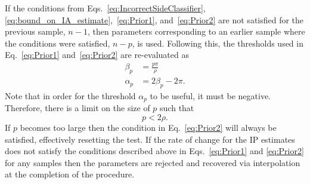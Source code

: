 \documentclass[11pt,draftcls,onecolumn]{IEEEtran}
\begin{document}
If the conditions from Eqs.~\ref{eq:IncorrectSideClassifier}, \ref{eq:bound_on_IA_estimate},~\ref{eq:Prior1}, and~\ref{eq:Prior2} are not satisfied for the previous sample, $n-1$, then parameters corresponding to an earlier sample where the conditions were satisfied, $n-p$, is used. Following this, the thresholds used in Eq.~\ref{eq:Prior1} and~\ref{eq:Prior2} are re-evaluated as
\begin{align}
	\beta_p &= \frac{p\pi}{\rho} \\
	\alpha_p &=2\beta_p-2\pi.
\end{align}
Note that in order for the threshold $\alpha_p$ to be useful, it must be negative. Therefore, there is a limit on the size of $p$ such that
\begin{equation}
	p < 2\rho.
\end{equation}
If $p$ becomes too large then the condition in Eq.~\ref{eq:Prior2} will always be satisfied, effectively resetting the test. If the rate of change for the IP estimates does not satisfy the conditions described above in Eqs.~\ref{eq:Prior1} and \ref{eq:Prior2} for any samples then the parameters are rejected and recovered via interpolation at the completion of the procedure.
\end{document}
